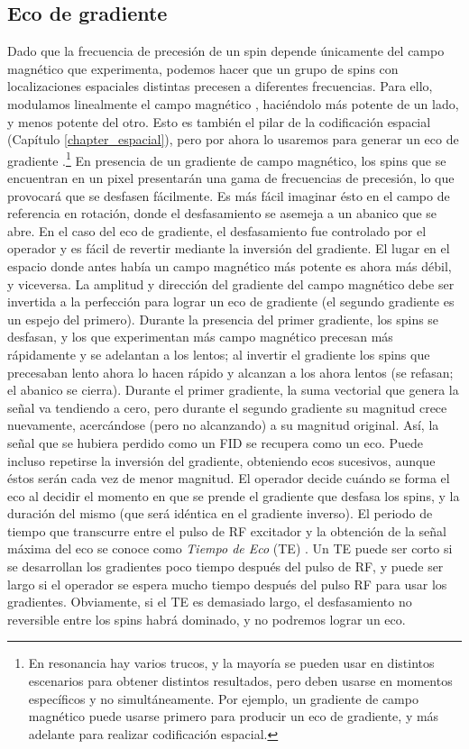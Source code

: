 \subsection{Eco de gradiente}
Dado que la frecuencia de precesión de un spin depende únicamente del campo magnético que experimenta, podemos hacer que un grupo de spins con localizaciones espaciales distintas precesen a diferentes frecuencias. Para ello, modulamos linealmente el campo magnético \Bzero, haciéndolo más potente de un lado, y menos potente del otro. Esto es también el pilar de la codificación espacial (Capítulo \ref{chapter_espacial}), pero por ahora lo usaremos para generar un eco de gradiente .\footnote{En resonancia hay varios trucos, y la mayoría se pueden usar en distintos escenarios para obtener distintos resultados, pero deben usarse en momentos específicos y no simultáneamente. Por ejemplo, un gradiente de campo magnético puede usarse primero para producir un eco de gradiente, y más adelante para realizar codificación espacial.} En presencia de un gradiente de campo magnético, los spins que se encuentran en un pixel presentarán una gama de frecuencias de precesión, lo que provocará que se desfasen fácilmente. Es más fácil imaginar ésto en el campo de referencia en rotación, donde el desfasamiento se asemeja a un abanico que se abre. En el caso del eco de gradiente, el desfasamiento fue controlado por el operador y es fácil de revertir mediante la inversión del gradiente. El lugar en el espacio donde antes había un campo magnético más potente es ahora más débil, y viceversa. La amplitud y dirección del gradiente del campo magnético debe ser invertida a la perfección para lograr un eco de gradiente (el segundo gradiente es un espejo del primero). Durante la presencia del primer gradiente, los spins se desfasan, y los que experimentan más campo magnético precesan más rápidamente y se adelantan a los lentos; al invertir el gradiente los spins que precesaban lento ahora lo hacen rápido y alcanzan a los ahora lentos (se refasan; el abanico se cierra). Durante el primer gradiente, la suma vectorial que genera la señal va tendiendo a cero, pero durante el segundo gradiente su magnitud crece nuevamente, acercándose (pero no alcanzando) a su magnitud original. Así, la señal que se hubiera perdido como un FID se recupera como un eco. Puede incluso repetirse la inversión del gradiente, obteniendo ecos sucesivos, aunque éstos serán cada vez de menor magnitud. El operador decide cuándo se forma el eco al decidir el momento en que se prende el gradiente que desfasa los spins, y la duración del mismo (que será idéntica en el gradiente inverso). El periodo de tiempo que transcurre entre el pulso de RF excitador y la obtención de la señal máxima del eco se conoce como \textit{Tiempo de Eco} (TE) . Un TE puede ser corto si se desarrollan los gradientes poco tiempo después del pulso de RF, y puede ser largo si el operador se espera mucho tiempo después del pulso RF para usar los gradientes. Obviamente, si el TE es demasiado largo, el desfasamiento no reversible entre los spins habrá dominado, y no podremos lograr un eco.

